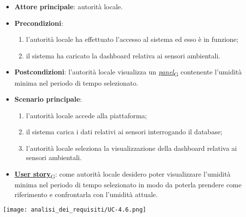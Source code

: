 \begin{itemize}
	\item \textbf{Attore principale}: autorità locale.
	\item \textbf{Precondizioni}:
	      \begin{enumerate}
		      \item l'autorità locale ha effettuato l'accesso al sistema ed esso è in funzione;
		      \item il sistema ha caricato la dashboard relativa ai sensori ambientali.
	      \end{enumerate}
	\item \textbf{Postcondizioni}: l'autorità locale visualizza un \href{https://7last.github.io/docs/pb/documentazione-interna/glossario\#panel}{\textit{panel}\textsubscript{G}} contenente l'umidità minima nel periodo di tempo selezionato.
	\item \textbf{Scenario principale}:
	      \begin{enumerate}
		      \item l'autorità locale accede alla piattaforma;
		      \item il sistema carica i dati relativi ai sensori interrogando il database;
		      \item l'autorità locale seleziona la visualizzazione della dashboard relativa ai sensori ambientali.
	      \end{enumerate}
	\item \href{https://7last.github.io/docs/pb/documentazione-interna/glossario\#user-story}{\textbf{User story}\textsubscript{G}}:
	      come autorità locale desidero poter visualizzare l'umidità minima nel periodo di tempo selezionato
	      in modo da poterla prendere come riferimento e confrontarla con l'umidità attuale.
\end{itemize}
\begin{center}
	\texttt{[image: analisi\_dei\_requisiti/UC-4.6.png]}
\end{center}

